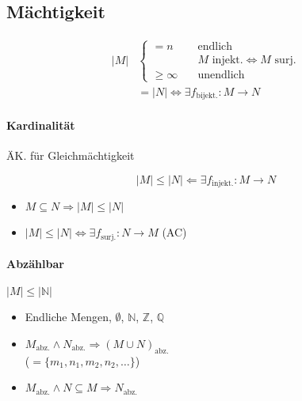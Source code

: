 \subsection{Mächtigkeit}

\begin{align*}
  |M| & \begin{cases}
    = n \quad         & \text{endlich}                                    \\
                      & M \text{ injekt.} \Leftrightarrow M \text{ surj.} \\
    \geq \infty \quad & \text{unendlich}
  \end{cases}                                         \\
      & = |N| \Leftrightarrow \exists f_{\text{bijekt.}}: M \rightarrow N
\end{align*}

\paragraph{Kardinalität}
ÄK. für Gleichmächtigkeit

$$|M| \leq |N| \Leftarrow \exists f_\text{injekt.}: M \rightarrow N$$

\begin{itemize}
  \item $M \subseteq N \Rightarrow |M| \leq |N|$
  \item $|M| \leq |N| \Leftrightarrow \exists f_\text{surj.}: N \rightarrow M$ (AC)
\end{itemize}

\paragraph{Abzählbar}  $|M| \leq |\mathbb{N}|$

\begin{itemize}
  \item Endliche Mengen, $\emptyset$, $\mathbb{N}$, $\mathbb{Z}$, $\boldsymbol{\mathbb{Q}}$
  \item $M_\text{abz.} \land N_\text{abz.} \Rightarrow (M \cup N)_\text{abz.}$ \\
        ($= \{ m_1, n_1, m_2, n_2, \dots \}$)

  \item $M_\text{abz.} \land N \subseteq M \Rightarrow N_\text{abz.}$
\end{itemize}

